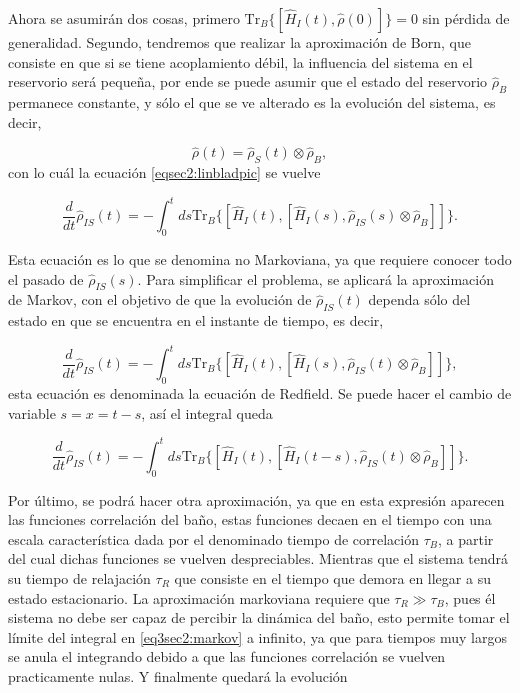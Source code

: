 Ahora se asumirán dos cosas, primero $\text{Tr}_{B}\{[\hat{H}_{I}(t),\hat{\rho}(0)] \} = 0$ sin pérdida de generalidad\cite{breuer2002theory}. Segundo, tendremos que realizar la aproximación de Born, que consiste en que si se tiene acoplamiento débil, la influencia del sistema en el reservorio será pequeña, por ende se puede asumir que el estado del reservorio $\hat{\rho}_{B}$ permanece constante, y sólo el que se ve alterado es la evolución del sistema, es decir,

\begin{equation*}
    \hat{\rho}(t) = \hat{\rho}_{S}(t)\otimes \hat{\rho}_{B},
\end{equation*}
con lo cuál la ecuación \ref{eqsec2:linbladpic} se vuelve

\begin{equation}
    \frac{d}{dt}\hat{\rho}_{IS}(t) = -  \int_{0}^{t}ds \text{Tr}_{B}\{[\hat{H}_{I}(t), [\hat{H}_{I}(s),\hat{\rho}_{IS}(s) \otimes \hat{\rho}_{B}]]\}.
\end{equation} 

Esta ecuación es lo que se denomina no Markoviana, ya que requiere conocer todo el pasado de $\hat{\rho}_{IS}(s)$. Para simplificar el problema, se aplicará la aproximación de Markov, con el objetivo de que la evolución de $\hat{\rho}_{IS}(t)$ dependa sólo del estado en que se encuentra en el instante de tiempo, es decir,

\begin{equation*}
    \frac{d}{dt}\hat{\rho}_{IS}(t) = -  \int_{0}^{t}ds \text{Tr}_{B}\{[\hat{H}_{I}(t), [\hat{H}_{I}(s),\hat{\rho}_{IS}(t) \otimes \hat{\rho}_{B}]]\},
\end{equation*} 
esta ecuación es denominada la ecuación de Redfield. Se puede hacer el cambio de variable $s= x = t-s$, así el integral queda

\begin{equation}
    \frac{d}{dt}\hat{\rho}_{IS}(t) = -  \int_{0}^{t}ds \text{Tr}_{B}\{[\hat{H}_{I}(t), [\hat{H}_{I}(t-s),\hat{\rho}_{IS}(t) \otimes \hat{\rho}_{B}]]\}.
    \label{eq3sec2:markov}
\end{equation} 

Por último, se podrá hacer otra aproximación, ya que en esta expresión aparecen las funciones correlación del baño, estas funciones decaen en el tiempo con una escala característica dada por el denominado tiempo de correlación $\tau_{B}$, a partir del cual dichas funciones se vuelven despreciables. Mientras que el sistema tendrá su tiempo de relajación $\tau_{R}$ que consiste en el tiempo que demora en llegar a su estado estacionario. La aproximación markoviana requiere que $\tau_{R}\gg \tau_{B}$, pues él sistema no debe ser capaz de percibir la dinámica del baño, esto permite tomar el límite del integral en \ref{eq3sec2:markov} a infinito, ya que para tiempos muy largos se anula el integrando debido a que las funciones correlación se vuelven practicamente nulas. Y finalmente quedará la evolución

